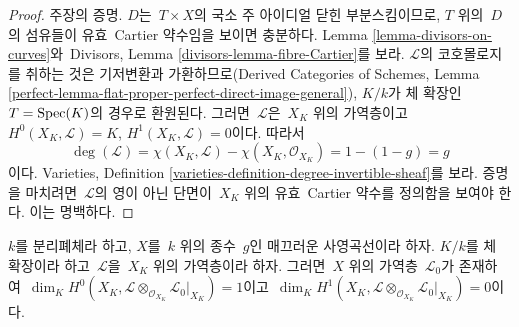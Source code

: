 \begin{proof}
\medskip\noindent
주장의 증명. $D$는\  $T \times X$의 국소 주 아이디얼 닫힌 부분스킴이므로,
$T$ 위의\  $D$의 섬유들이 유효\  Cartier 약수임을 보이면 충분하다.
Lemma \ref{lemma-divisors-on-curves}와\  Divisors, Lemma
\ref{divisors-lemma-fibre-Cartier}를 보라. $\mathcal{L}$의 코호몰로지를 취하는
것은 기저변환과 가환하므로(Derived Categories of Schemes, Lemma
\ref{perfect-lemma-flat-proper-perfect-direct-image-general}), $K/k$가 체
확장인\  $T = \mathop{\mathrm{Spec}}(K)$의 경우로 환원된다. 그러면\  $\mathcal{L}$은\  $X_K$ 위의
가역층이고\  $H^0(X_K, \mathcal{L}) = K$,
$H^1(X_K, \mathcal{L}) = 0$이다. 따라서
$$
\deg(\mathcal{L}) = \chi(X_K, \mathcal{L}) - \chi(X_K, \mathcal{O}_{X_K})
= 1 - (1 - g) = g
$$
이다. Varieties, Definition
\ref{varieties-definition-degree-invertible-sheaf}를 보라. 증명을 마치려면\ 
$\mathcal{L}$의 영이 아닌 단면이\  $X_K$ 위의 유효\  Cartier 약수를 정의함을
보여야 한다. 이는 명백하다.
\end{proof}

\begin{lemma}
\label{lemma-twist-with-general-divisor}
$k$를 분리폐체라 하고, $X$를\  $k$ 위의 종수\  $g$인 매끄러운 사영곡선이라
하자. $K/k$를 체 확장이라 하고\  $\mathcal{L}$을\  $X_K$ 위의 가역층이라 하자.
그러면\  $X$ 위의 가역층\  $\mathcal{L}_0$가 존재하여\ 
$\dim_K H^0(X_K,
\mathcal{L} \otimes_{\mathcal{O}_{X_K}} \mathcal{L}_0|_{X_K}) = 1$이고\ 
$\dim_K H^1(X_K,
\mathcal{L} \otimes_{\mathcal{O}_{X_K}} \mathcal{L}_0|_{X_K}) = 0$이다.
\end{lemma}

